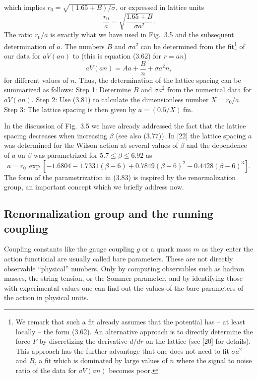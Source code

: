 which implies $r_0 = \sqrt{(1.65 + B)/\sigma}$, or expressed in lattice units
\begin{equation}
  \frac{r_0}{a} = \sqrt{\frac{1.65 + B}{\sigma a^2}} .
\end{equation}
The ratio $r_0/a$ is exactly what we have used in Fig.~3.5 and the subsequent
determination of $a$. The numbers $B$ and $\sigma a^2$ can be determined from
the fit\footnote{We remark that such a fit already assumes that the potential
has -- at least locally -- the form (3.62). An alternative approach is to
directly determine the force $F$ by discretizing the derivative $d/dr$ on the
lattice (see [20] for details). This approach has the further advantage that one
does not need to fit $\sigma a^2$ and $B$, a fit which is dominated by large
values of $n$ where the signal to noise ratio of the data for $aV(an)$ becomes
poor.} of our data for $aV(an)$ to (this is equation (3.62) for $r = an$)
\begin{equation}
  aV(an) = Aa + \frac{B}{n} + \sigma a^2 n ,
\end{equation}
for different values of $n$. Thus, the determination of the lattice spacing can
be summarized as follows: Step 1: Determine $B$ and $\sigma a^2$ from the
numerical data for $aV(an)$. Step 2: Use (3.81) to calculate the dimensionless
number $X = r_0/a$. Step 3: The lattice spacing is then given by
$a = (0.5/X)\ \mathrm{fm}$.

In the discussion of Fig.~3.5 we have already addressed the fact that the
lattice spacing decreases when increasing $\beta$ (see also (3.77)). In [22]
the lattice spacing $a$ was determined for the Wilson action at several values
of $\beta$ and the dependence of $a$ on $\beta$ was parametrized for
$5.7 \leq \beta \leq 6.92$ as
\begin{equation}
  a = r_0\,\exp\!\left[-1.6804 - 1.7331(\beta - 6) + 0.7849(\beta - 6)^2
    - 0.4428(\beta - 6)^3\right] .
\end{equation}
The form of the parametrization in (3.83) is inspired by the renormalization
group, an important concept which we briefly address now.

\subsection{Renormalization group and the running coupling}

Coupling constants like the gauge coupling $g$ or a quark mass $m$ as they
enter the action functional are usually called bare parameters. These are not
directly observable ``physical'' numbers. Only by computing observables such as
hadron masses, the string tension, or the Sommer parameter, and by identifying
those with experimental values one can find out the values of the bare
parameters of the action in physical units.

